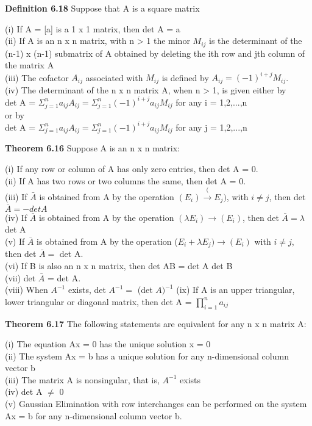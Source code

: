 \documentclass{article}
\begin{document}
\textbf {Definition 6.18} Suppose that A is a square matrix
\begin{center}
(i) If A = [a] is a 1 x 1 matrix, then det A = a \\
(ii) If A is an n x n matrix, with n > 1 the minor $M_{ij}$ is the determinant of the (n-1) x (n-1) submatrix of A obtained by deleting the ith row and jth column of the matrix A \\
(iii) The cofactor $A_{ij}$ associated with $M_{ij}$ is defined by $A_{ij} = (-1)^{i+j} M_{ij}$. \\
(iv) The determinant of the n x n matrix A, when n > 1, is given either by \\
det A = $\Sigma_{j=1}^{n} a_{ij} A_{ij} = \Sigma_{j=1}^{n} (-1)^{i+j} a_{ij} M_{ij}$ for any i = 1,2,...,n \\
or by \\
det A = $\Sigma_{j=1}^{n} a_{ij} A_{ij} = \Sigma_{j=1}^{n} (-1)^{i+j} a_{ij} M_{ij}$ for any j = 1,2,...,n
\end{center}

\textbf {Theorem 6.16} Suppose A is an n x n matrix: 
\begin{center}
(i) If any row or column of A has only zero entries, then det A = 0. \\
(ii) If A has two rows or two columns the same, then det A = 0. \\
(iii) If $\bar{A}$ is obtained from A by the operation $(E_i) \xrightarrow (E_j)$, with $ i \neq j$, then det $\bar{A} = -det A$ \\
(iv) If $\bar{A}$ is obtained from A by the operation $(\lambda E_i) \rightarrow (E_i)$, then det $\bar{A} = \lambda$ det A \\
(v) If $\bar{A}$ is obtained from A by the operation ($E_i + \lambda E_j) \rightarrow (E_i)$ with $i \neq j$, then det $\bar{A} = $ det A. \\
(vi) If B is also an n x n matrix, then det AB = det A det B \\
(vii) det $\bar{A}$ = det A.\\
(viii) When $A^{-1}$ exists, det $A^{-1} = $ (det $ A)^{-1}$
(ix) If A is an upper triangular, lower triangular or diagonal matrix, then det A = $\prod_{i=1}^{n} a_{ij}$
\end{center}

\textbf {Theorem 6.17} The following statements are equivalent for any n x n matrix A:
\begin{center}
(i) The equation Ax = 0 has the unique solution x = 0 \\
(ii) The system Ax = b has a unique solution for any n-dimensional column vector b \\
(iii) The matrix A is nonsingular, that is, $A^{-1}$ exists \\
(iv) det A $\neq$ 0 \\
(v) Gaussian Elimination with row interchanges can be performed on the system Ax = b for any n-dimensional column vector b.
\end{center}
\end{document}
